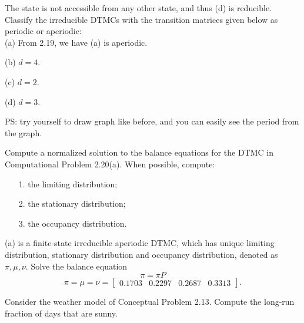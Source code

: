 \documentclass[  11pt]{article}
\newcommand{\snum}[1]{ \raisebox{.5pt}{\textcircled{\raisebox{-.9pt} {#1}}}}
\begin{document}
\begin{ExerciseList}
\begin{center}
\end{center}

The state \snum{3} is not accessible from  any other state, and thus (d) is reducible.\\
 



\Exercise[origin={p55, 2.20}]
 Classify the irreducible DTMCs with the transition matrices given below as
periodic or aperiodic:\\

\Answer
(a) From 2.19, we have (a) is aperiodic.\par
(b) $d = 4$.\par
(c) $d = 2.$\par
(d) $d = 3.$\par
PS: try yourself to draw graph like before, and you can easily see the period from the graph.
 

 
\Exercise[origin={p56, 2.21}]
 Compute a normalized solution to the balance equations for the DTMC in
Computational Problem 2.20(a). When possible, compute:
\begin{itemize}
\item[1.]the limiting distribution;
\item[2.]the stationary distribution;
\item[3.]the occupancy distribution.
\end{itemize}
\Answer
\par

(a) is a finite-state irreducible aperiodic DTMC, which has unique limiting distribution, stationary distribution and occupancy distribution, denoted as $\pi, \mu,\nu$.
Solve the balance equation
\[
\pi=\pi P
\]
\[
\pi=\mu=\nu= \begin{bmatrix}
	0.1703&
    0.2297& 
    0.2687& 
    0.3313
\end{bmatrix}.
\]
\vspace{1\baselineskip}





\Exercise[origin={p57, 2.28}]
 Consider the weather model of Conceptual Problem 2.13. Compute the long-run fraction of days that are sunny.\\


\end{ExerciseList}
\end{document}
